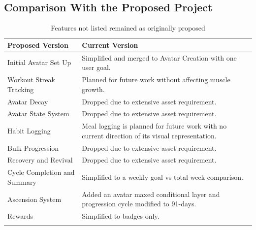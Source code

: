 \documentclass[11pt]{article}
\begin{document}
\subsection{Comparison With the Proposed Project}
\label{sec:comparison}

\begin{table}[H]
    \centering
    \caption{Features of the original proposal compared with the implemented MVP.}
    \label{tab:featurechanges}
    \begin{tabularx}{\textwidth}{
        >{\raggedright\arraybackslash}X
        >{\raggedright\arraybackslash}X
    }
        \toprule
        \textbf{Proposed Version} & 
        \textbf{Current Version} \\
    
        \midrule
        Initial Avatar Set Up &
        Simplified and merged to Avatar Creation with one user goal. \\
        \addlinespace

        Workout Streak Tracking &
        Planned for future work without affecting muscle growth. \\
        \addlinespace
        
        Avatar Decay &
        Dropped due to extensive asset requirement. \\
        \addlinespace

        Avatar State System &
        Dropped due to extensive asset requirement. \\
        \addlinespace

        Habit Logging &
        Meal logging is planned for future work 
        with no current direction of its visual representation. \\
        \addlinespace

        Bulk Progression &
        Dropped due to extensive asset requirement. \\
        \addlinespace

        Recovery and Revival &
        Dropped due to extensive asset requirement. \\
        \addlinespace

        Cycle Completion and Summary &
        Simplified to a weekly goal vs total week comparison. \\
        \addlinespace

        Ascension System &
        Added an avatar maxed conditional layer and progression
        cycle modified to 91-days. \\
        \addlinespace

        Rewards &
        Simplified to badges only. \\
        \addlinespace
        \bottomrule
    \end{tabularx}
    \caption*{Features not listed remained as originally proposed}
\end{table}
\end{document}

